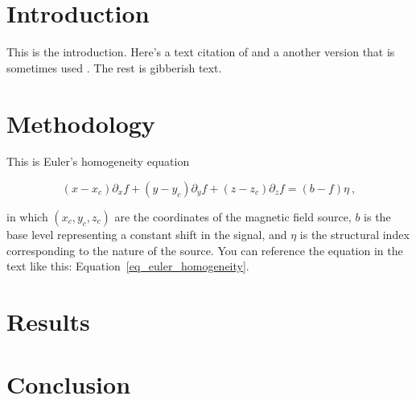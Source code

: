 \section{Introduction}

This is the introduction. Here's a text citation of \citet{OliveiraJr2015}
and a another version that is sometimes used \citep{OliveiraJr2015}.
The rest is gibberish text.

\lipsum[1-6]


\section{Methodology}

This is Euler's homogeneity equation

\begin{equation}
  \label{eq_euler_homogeneity}
  (x - x_c)\partial_x f + (y - y_c)\partial_y f + (z - z_c)\partial_z f
  = (b - f)\eta
  \ ,
\end{equation}

\noindent
in which $(x_c, y_c, z_c)$ are the coordinates of the magnetic field source,
$b$ is the base level representing a constant shift in the signal, and $\eta$
is the structural index corresponding to the nature of the source. You can
reference the equation in the text like this:
Equation~\ref{eq_euler_homogeneity}.

\lipsum[10-16]



\section{Results}



\lipsum[5-10]


\section{Conclusion}

\lipsum[1-5]


